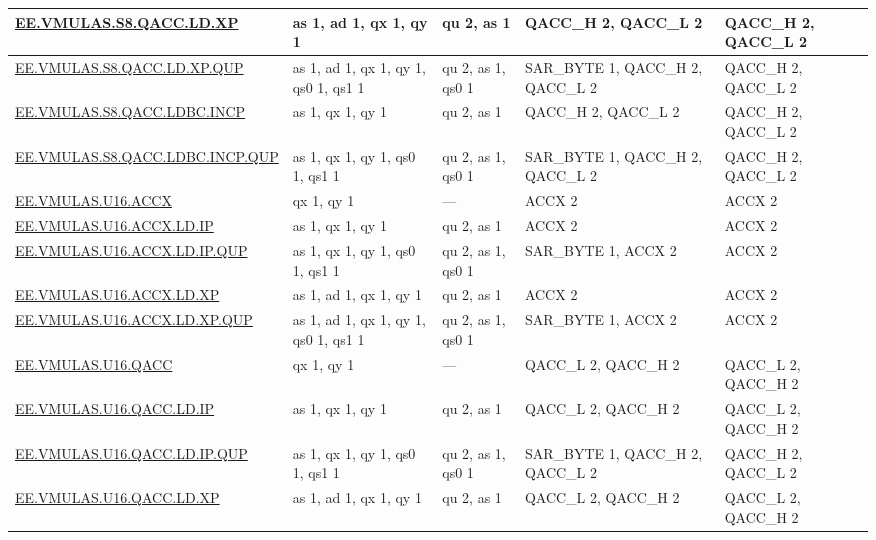 \begin{longtable}[c]{|l|m{2.5cm}|m{2.5cm}|m{2.5cm}|m{2.5cm}|}
    \hyperref[instruction:EEVMULASS8QACCLDXP]{EE.VMULAS.S8.QACC.LD.XP} & as 1, ad 1, qx 1, qy 1 & qu 2, as 1 & QACC\_H 2, QACC\_L 2 & QACC\_H 2, QACC\_L 2\\\hline
    \hyperref[instruction:EEVMULASS8QACCLDXPQUP]{EE.VMULAS.S8.QACC.LD.XP.QUP} & as 1, ad 1, qx 1, qy 1, qs0 1, qs1 1 & qu 2, as 1, qs0 1 & SAR\_BYTE 1, QACC\_H 2, QACC\_L 2 & QACC\_H 2, QACC\_L 2\\\hline
    \hyperref[instruction:EEVMULASS8QACCLDBCINCP]{EE.VMULAS.S8.QACC.LDBC.INCP} & as 1, qx 1, qy 1 & qu 2, as 1 & QACC\_H 2, QACC\_L 2 & QACC\_H 2, QACC\_L 2\\\hline
    \hyperref[instruction:EEVMULASS8QACCLDBCINCPQUP]{EE.VMULAS.S8.QACC.LDBC.INCP.QUP} & as 1, qx 1, qy 1, qs0 1, qs1 1 & qu 2, as 1, qs0 1 & SAR\_BYTE 1, QACC\_H 2, QACC\_L 2 & QACC\_H 2, QACC\_L 2\\\hline
    \hyperref[instruction:EEVMULASU16ACCX]{EE.VMULAS.U16.ACCX} & qx 1, qy 1 & — & ACCX 2 & ACCX 2\\\hline
    \hyperref[instruction:EEVMULASU16ACCXLDIP]{EE.VMULAS.U16.ACCX.LD.IP} & as 1, qx 1, qy 1 & qu 2, as 1 & ACCX 2 & ACCX 2\\\hline
    \hyperref[instruction:EEVMULASU16ACCXLDIPQUP]{EE.VMULAS.U16.ACCX.LD.IP.QUP} & as 1, qx 1, qy 1, qs0 1, qs1 1 & qu 2, as 1, qs0 1 & SAR\_BYTE 1, ACCX 2 & ACCX 2\\\hline
    \hyperref[instruction:EEVMULASU16ACCXLDXP]{EE.VMULAS.U16.ACCX.LD.XP} & as 1, ad 1, qx 1, qy 1 & qu 2, as 1 & ACCX 2 & ACCX 2\\\hline
    \hyperref[instruction:EEVMULASU16ACCXLDXPQUP]{EE.VMULAS.U16.ACCX.LD.XP.QUP} & as 1, ad 1, qx 1, qy 1, qs0 1, qs1 1 & qu 2, as 1, qs0 1 & SAR\_BYTE 1, ACCX 2 & ACCX 2\\\hline
    \hyperref[instruction:EEVMULASU16QACC]{EE.VMULAS.U16.QACC} & qx 1, qy 1 & — & QACC\_L 2, QACC\_H 2 & QACC\_L 2, QACC\_H 2\\\hline
    \hyperref[instruction:EEVMULASU16QACCLDIP]{EE.VMULAS.U16.QACC.LD.IP} & as 1, qx 1, qy 1 & qu 2, as 1 & QACC\_L 2, QACC\_H 2 & QACC\_L 2, QACC\_H 2\\\hline
    \hyperref[instruction:EEVMULASU16QACCLDIPQUP]{EE.VMULAS.U16.QACC.LD.IP.QUP} & as 1, qx 1, qy 1, qs0 1, qs1 1 & qu 2, as 1, qs0 1 & SAR\_BYTE 1, QACC\_H 2, QACC\_L 2 & QACC\_H 2, QACC\_L 2\\\hline
    \hyperref[instruction:EEVMULASU16QACCLDXP]{EE.VMULAS.U16.QACC.LD.XP} & as 1, ad 1, qx 1, qy 1 & qu 2, as 1 & QACC\_L 2, QACC\_H 2 & QACC\_L 2, QACC\_H 2\\\hline

\end{longtable}
